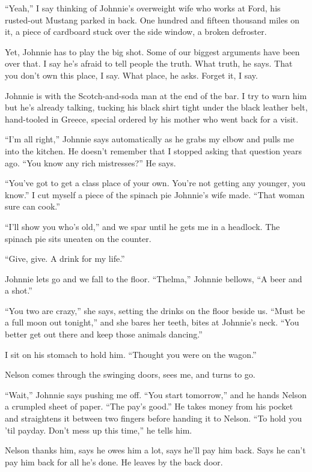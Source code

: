 \documentclass[twoside,10pt]{book}
\begin{document}
``Yeah,'' I say thinking of Johnnie's overweight wife who works at Ford,
his rusted-out Mustang parked in back. One hundred and fifteen thousand
miles on it, a piece of cardboard stuck over the side window, a broken
defroster.

Yet, Johnnie has to play the big shot. Some of our biggest arguments
have been over that. I say he's afraid to tell people the truth. What
truth, he says. That you don't own this place, I say. What place, he
asks. Forget it, I say.

Johnnie is with the Scotch-and-soda man at the end of the bar. I try to
warn him but he's already talking, tucking his black shirt tight under
the black leather belt, hand-tooled in Greece, special ordered by his
mother who went back for a visit.

``I'm all right,'' Johnnie says automatically as he grabs my elbow and
pulls me into the kitchen. He doesn't remember that I stopped asking
that question years ago. ``You know any rich mistresses?'' He says.

``You've got to get a class place of your own. You're not getting any
younger, you know.'' I cut myself a piece of the spinach pie Johnnie's
wife made. ``That woman sure can cook.''

``I'll show you who's old,'' and we spar until he gets me in a headlock.
The spinach pie sits uneaten on the counter.

``Give, give. A drink for my life.''

Johnnie lets go and we fall to the floor. ``Thelma,'' Johnnie bellows,
``A beer and a shot.''

``You two are crazy,'' she says, setting the drinks on the floor beside
us. ``Must be a full moon out tonight,'' and she bares her teeth, bites
at Johnnie's neck. ``You better get out there and keep those animals
dancing.''

I sit on his stomach to hold him. ``Thought you were on the wagon.''

Nelson comes through the swinging doors, sees me, and turns to go.

``Wait,'' Johnnie says pushing me off. ``You start tomorrow,'' and he
hands Nelson a crumpled sheet of paper. ``The pay's good.'' He takes
money from his pocket and straightens it between two fin­gers before
handing it to Nelson. ``To hold you 'til payday. Don't mess up this
time,'' he tells him.

Nelson thanks him, says he owes him a lot, says he'll pay him back. Says
he can't pay him back for all he's done. He leaves by the back door.
\end{document}
